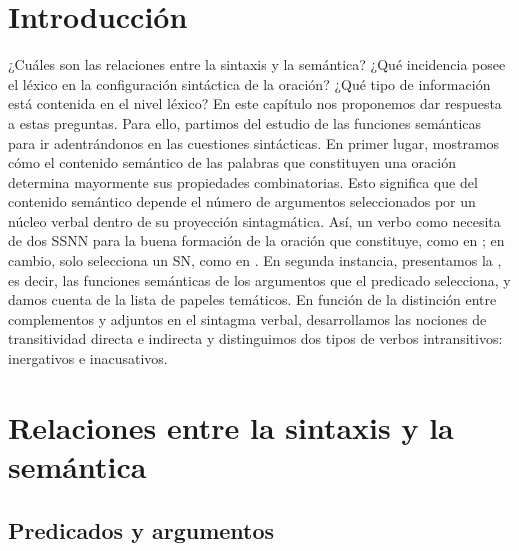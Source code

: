 
\section{Introducción}

¿Cuáles son las relaciones entre la sintaxis y la semántica? ¿Qué incidencia
posee el léxico en la configuración sintáctica de la oración? ¿Qué tipo de
información está contenida en el nivel léxico? En este capítulo nos proponemos
dar respuesta a estas preguntas. Para ello, partimos del estudio de las
funciones semánticas para ir adentrándonos en las cuestiones sintácticas. En
primer lugar, mostramos cómo el contenido semántico de las palabras que
constituyen una oración determina mayormente sus propiedades combinatorias. Esto
significa que del contenido semántico depende el número de argumentos
seleccionados por un núcleo verbal dentro de su proyección sintagmática. Así, un
verbo como  necesita de dos SSNN para la buena formación de la
oración que constituye, como en ; en cambio,
 solo selecciona un SN, como en . En segunda
instancia, presentamos la , es decir, las funciones
semánticas de los argumentos que el predicado selecciona, y damos cuenta de la
lista de papeles temáticos. En función de la distinción entre complementos y
adjuntos en el sintagma verbal, desarrollamos las nociones de transitividad
directa e indirecta y distinguimos dos tipos de verbos intransitivos:
inergativos e inacusativos.

\section{Relaciones entre la sintaxis y la semántica}\label{sec:07-sintsem}

\subsection{Predicados y argumentos}\label{sec:07-predicados}

